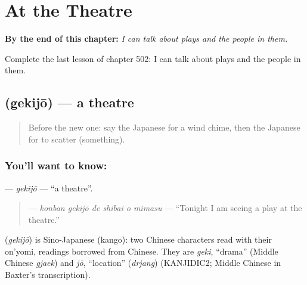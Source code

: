 
\chapter{At the Theatre}
\label{ch:ja-at-the-theatre}

\begin{chapteropening}
\textbf{By the end of this chapter:} \emph{I can talk about plays and the people in them.}

Complete the last lesson of chapter 502: I can talk about plays and the people in them.
\end{chapteropening}

\section[\texorpdfstring{\ja{げきじょう} (gekijō)}{げきじょう (gekijō)}]{ (gekijō) — a theatre}

\label{lesson:JA-C502-gekijou}



\begin{quote}
Before the new one: say the Japanese for a wind chime, then the Japanese for to scatter (something).
\end{quote}

\subsection*{You'll want to know: }
\textbf{} — \emph{gekijō} — \textquotedblleft{}a theatre\textquotedblright{}.

\begin{quote}
\textbf{   } — \emph{konban gekijō de shibai o mimasu} — \textquotedblleft{}Tonight I am seeing a play at the theatre.\textquotedblright{}
\end{quote}

\begin{cousinweb}
\textbf{} (\emph{gekijō}) is Sino-Japanese (kango): two Chinese characters read with their on'yomi, readings borrowed from Chinese. They are \emph{geki}, \textquotedblleft{}drama\textquotedblright{} (Middle Chinese \emph{gjaek}) and \emph{jō}, \textquotedblleft{}location\textquotedblright{} (\emph{drjang}) (KANJIDIC2; Middle Chinese in Baxter's transcription).
\end{cousinweb}

